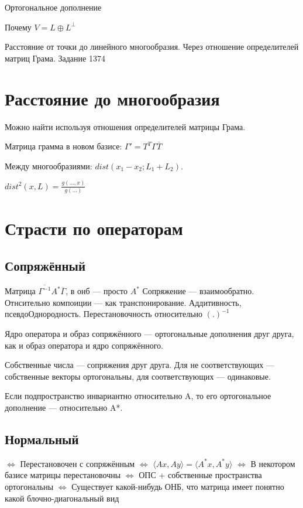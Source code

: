 \documentclass[12pt, a4paper]{article}
\begin{document}
Ортогональное дополнение


Почему $V = L \oplus L^{\perp}$

Расстояние от точки до линейного многообразия. Через отношение определителей матриц Грама. Задание 1374



\section{Расстояние до многообразия}

Можно найти используя отношения определителей матрицы Грама.

Матрица грамма в новом базисе: $\Gamma' = T^T \Gamma \overline{T}$

Между многообразиями: $dist(x_1 - x_2; L_1 + L_2)$.

$dist^2(x, L) = \frac{g(…, x)}{g(…)}$

\section{Страсти по операторам}

\subsection{Сопряжённый}

Матрица $\overline{\Gamma^{-1}} A^* \overline{\Gamma}$, в онб — просто $A^*$
Сопряжение — взаимообратно.
Отнсительно компоиции — как транспонирование.
Аддитивность, псевдоОднородность.
Перестановочность относительно $(.)^{-1}$

Ядро оператора и образ сопряжённого — ортогональные дополнения друг друга, как и образ оператора и ядро сопряжённого.


Собственные числа — сопряжения друг друга.
Для не соответствующих — собственные векторы ортогональны, для соответствующих — одинаковые.

Если подпространство инвариантно относительно A, то его ортогональное дополнение — относительно A*.


\subsection{Нормальный}

$\Longleftrightarrow$ Перестановочен с сопряжённым 
$\Longleftrightarrow$ $\langle A x, A y \rangle = \langle A^* x, A^* y \rangle$ 
$\Longleftrightarrow$ В некотором базисе матрицы перестановочны
$\Longleftrightarrow$ ОПС + собственные пространства ортогональны 
$\Longleftrightarrow$ Существует какой-нибудь ОНБ, что матрица имеет понятно какой блочно-диагональный вид
\end{document}

